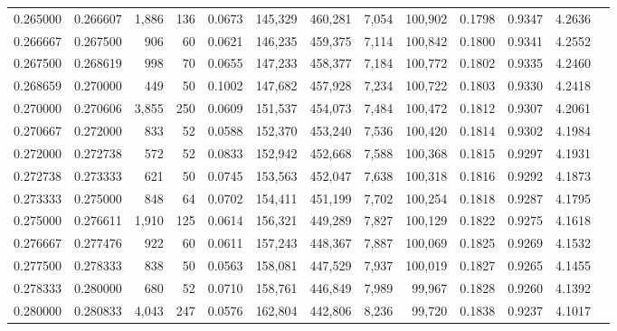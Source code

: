 \begin{tabular}{rrrrrrrrrrrrr}
0.265000 & 0.266607 & 1,886 & 136 &                                     0.0673 & 145,329 & 460,281 &   7,054 & 100,902 & 0.1798 & 0.9347 & 4.2636 \\
0.266667 & 0.267500 &   906 &  60 &                                     0.0621 & 146,235 & 459,375 &   7,114 & 100,842 & 0.1800 & 0.9341 & 4.2552 \\
0.267500 & 0.268619 &   998 &  70 &                                     0.0655 & 147,233 & 458,377 &   7,184 & 100,772 & 0.1802 & 0.9335 & 4.2460 \\
0.268659 & 0.270000 &   449 &  50 &                                     0.1002 & 147,682 & 457,928 &   7,234 & 100,722 & 0.1803 & 0.9330 & 4.2418 \\
0.270000 & 0.270606 & 3,855 & 250 &                                     0.0609 & 151,537 & 454,073 &   7,484 & 100,472 & 0.1812 & 0.9307 & 4.2061 \\
0.270667 & 0.272000 &   833 &  52 &                                     0.0588 & 152,370 & 453,240 &   7,536 & 100,420 & 0.1814 & 0.9302 & 4.1984 \\
0.272000 & 0.272738 &   572 &  52 &                                     0.0833 & 152,942 & 452,668 &   7,588 & 100,368 & 0.1815 & 0.9297 & 4.1931 \\
0.272738 & 0.273333 &   621 &  50 &                                     0.0745 & 153,563 & 452,047 &   7,638 & 100,318 & 0.1816 & 0.9292 & 4.1873 \\
0.273333 & 0.275000 &   848 &  64 &                                     0.0702 & 154,411 & 451,199 &   7,702 & 100,254 & 0.1818 & 0.9287 & 4.1795 \\
0.275000 & 0.276611 & 1,910 & 125 &                                     0.0614 & 156,321 & 449,289 &   7,827 & 100,129 & 0.1822 & 0.9275 & 4.1618 \\
0.276667 & 0.277476 &   922 &  60 &                                     0.0611 & 157,243 & 448,367 &   7,887 & 100,069 & 0.1825 & 0.9269 & 4.1532 \\
0.277500 & 0.278333 &   838 &  50 &                                     0.0563 & 158,081 & 447,529 &   7,937 & 100,019 & 0.1827 & 0.9265 & 4.1455 \\
0.278333 & 0.280000 &   680 &  52 &                                     0.0710 & 158,761 & 446,849 &   7,989 &  99,967 & 0.1828 & 0.9260 & 4.1392 \\
0.280000 & 0.280833 & 4,043 & 247 &                                     0.0576 & 162,804 & 442,806 &   8,236 &  99,720 & 0.1838 & 0.9237 & 4.1017 \\

\end{tabular}
